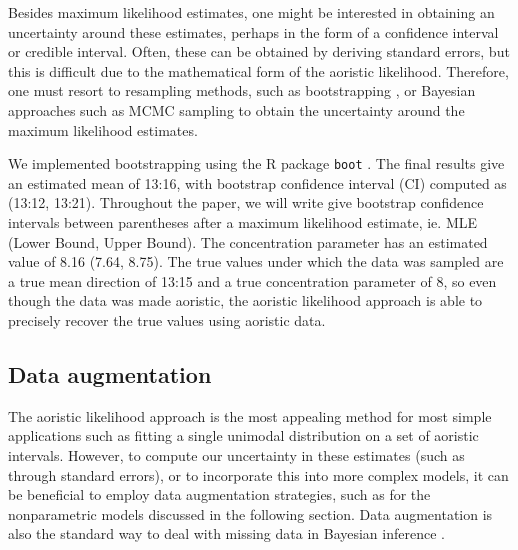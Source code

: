 Besides maximum likelihood estimates, one might be interested in obtaining an uncertainty around these estimates, perhaps in the form of a confidence interval or credible interval. Often, these can be obtained by deriving standard errors, but this is difficult due to the mathematical form of the aoristic likelihood. Therefore, one must resort to resampling methods, such as bootstrapping \citep{bootbook}, or Bayesian approaches such as MCMC sampling to obtain the uncertainty around the maximum likelihood estimates.




We implemented bootstrapping using the R package \texttt{boot} \citep{bootmanual}. The final results give an estimated mean of 13:16, with bootstrap confidence interval (CI) computed as (13:12, 13:21). Throughout the paper, we will write give bootstrap confidence intervals between parentheses after a maximum likelihood estimate, ie. MLE (Lower Bound, Upper Bound). The concentration parameter has an estimated value of 8.16 (7.64, 8.75). The true values under which the data was sampled are a true mean direction of 13:15 and a true  concentration parameter of 8, so even though the data was made aoristic, the aoristic likelihood approach is able to precisely recover the true values using aoristic data.


\subsection{Data augmentation} \label{dataaug}

The aoristic likelihood approach is the most appealing method for most simple applications such as fitting a single unimodal distribution on a set of aoristic intervals. However, to compute our uncertainty in these estimates (such as through standard errors), or to incorporate this into more complex models, it can be beneficial to employ data augmentation strategies, such as for the nonparametric models discussed in the following section. Data augmentation is also the standard way to deal with missing data in Bayesian inference \citep{gelman2003bayesian}.

